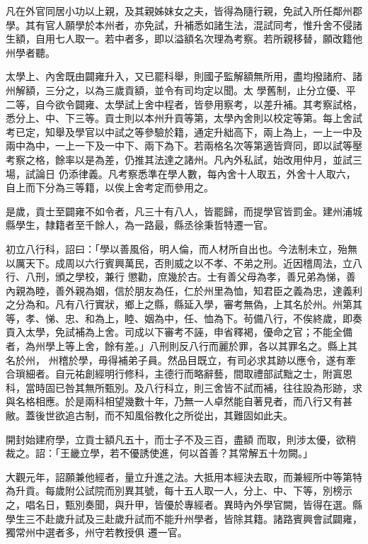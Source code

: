 \begin{pinyinscope}
 凡在外官同居小功以上親，及其親姊妹女之夫，皆得為隨行親，免試入所任鄰州郡學。其有官人願學於本州者，亦免試，升補悉如諸生法，混試同考，惟升舍不侵諸生額，自用七人取一。若中者多，即以溢額名次理為考察。若所親移替，願改籍他州學者聽。



 太學上、內舍既由闢雍升入，又已罷科舉，則國子監解額無所用，盡均撥諸府、諸州解額，三分之，以為三歲貢額，並令有司均定以聞。太
 學舊制，止分立優、平二等，自今欲令闢雍、太學試上舍中程者，皆參用察考，以差升補。其考察試格，悉分上、中、下三等。貢士則以本州升貢等第，太學內舍則以校定等第。每上舍試考已定，知舉及學官以中試之等參驗於籍，通定升絀高下，兩上為上，一上一中及兩中為中，一上一下及一中下、兩下為下。若兩格名次等第適皆齊同，即以試等壓考察之格，餘率以是為差，仍推其法達之諸州。凡內外私試，始改用仲月，並試三場，試論日
 仍添律義。凡考察悉準在學人數，每內舍十人取五，外舍十人取六，自上而下分為三等籍，以俟上舍考定而參用之。



 是歲，貢士至闢雍不如令者，凡三十有八人，皆罷歸，而提學官皆罰金。建州浦城縣學生，隸籍者至千餘人，為一路最，縣丞徐秉哲特遷一官。



 初立八行科，詔曰：「學以善風俗，明人倫，而人材所自出也。今法制未立，殆無以厲天下。成周以六行賓興萬民，否則威之以不孝、不弟之刑。近因稽周法，立八行、八刑，頒之學校，兼行
 懲勸，庶幾於古。士有善父母為孝，善兄弟為悌，善內親為睦，善外親為姻，信於朋友為任，仁於州里為恤，知君臣之義為忠，達義利之分為和。凡有八行實狀，鄉上之縣，縣延入學，審考無偽，上其名於州。州第其等，孝、悌、忠、和為上，睦、姻為中，任、恤為下。茍備八行，不俟終歲，即奏貢入太學，免試補為上舍。司成以下審考不誣，申省釋褐，優命之官；不能全備者，為州學上等上舍，餘有差。」八刑則反八行而麗於罪，各以其罪名之。縣上其名於州，
 州稽於學，毋得補弟子員。然品目既立，有司必求其跡以應令，遂有牽合瑣細者。自元祐創經明行修科，主德行而略辭藝，間取禮部試黜之士，附寘恩科，當時固已咎其無所甄別。及八行科立，則三舍皆不試而補，往往設為形跡，求與名格相應。於是兩科相望幾數十年，乃無一人卓然能自著見者，而八行又有甚敝。蓋後世欲追古制，而不知風俗教化之所從出，其難固如此夫。



 開封始建府學，立貢士額凡五十，而士子不及三百，盡額
 而取，則涉太優，欲稍裁之。詔：「王畿立學，若不優誘使進，何以首善？其常解五十勿闕。」



 大觀元年，詔願兼他經者，量立升進之法。大抵用本經決去取，而兼經所中等第特為升貢。每歲附公試院而別異其號，每十五人取一人，分上、中、下等，別榜示之，唱名日，甄別奏聞，與升甲，皆優於專經者。異時內外學官闕，皆得在選。縣學生三不赴歲升試及三赴歲升試而不能升州學者，皆除其籍。諸路賓興會試闢雍，獨常州中選者多，州守若教授俱
 遷一官。




\end{pinyinscope}
